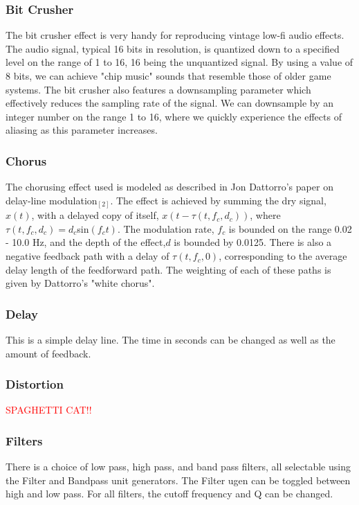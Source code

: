 \documentclass[pdftext,twoside,10pt]{article}
\newcommand{\spag}{\textcolor{red}{SPAGHETTI CAT!!}}
\begin{document}
\subsubsection*{Bit Crusher}
The bit crusher effect is very handy for reproducing vintage low-fi audio effects. The audio signal, typical 16 bits in resolution, is quantized down to a specified level on the range of 1 to 16, 16 being the unquantized signal. By using a value of 8 bits, we can achieve "chip music" sounds that resemble those of older game systems. The bit crusher also features a downsampling parameter which effectively reduces the sampling rate of the signal. We can downsample by an integer number on the range 1 to 16, where we quickly experience the effects of aliasing as this parameter increases.

\subsubsection*{Chorus} 
The chorusing effect used is modeled as described in Jon Dattorro's paper on delay-line modulation$_{[2]}$. The effect is achieved by summing the dry signal, $x(t)$, with a delayed copy of itself, $x(t - \tau(t,f_c,d_c))$, where $\tau(t,f_c,d_c) =d_c$sin$(f_ct)$. The modulation rate, $f_c$ is bounded on the range 0.02 - 10.0 Hz, and the depth of the effect,$d$ is bounded by 0.0125. There is also a negative feedback path with a delay of $\tau(t,f_c,0)$, corresponding to the average delay length of the feedforward path. The weighting of each of these paths is given by Dattorro's "white chorus".

\subsubsection*{Delay}
This is a simple delay line. The time in seconds can be changed as well as the amount of feedback.

\subsubsection*{Distortion}
\spag

\subsubsection*{Filters}
There is a choice of low pass, high pass, and band pass filters, all selectable using the Filter and Bandpass unit generators. The Filter ugen can be toggled between high and low pass. For all filters, the cutoff frequency and Q can be changed.
\end{document}
